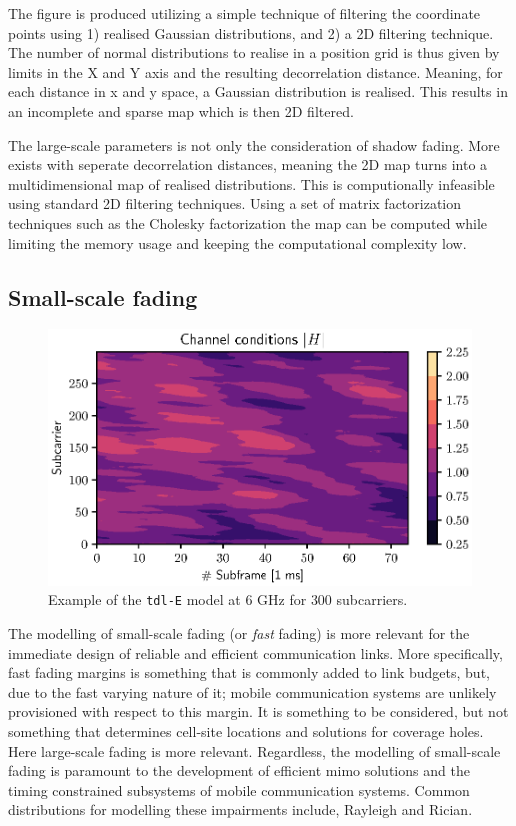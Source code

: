 The figure is produced utilizing a simple technique of filtering the coordinate points using 1) realised Gaussian distributions, and 2) a 2D filtering technique. The number of normal distributions to realise in a position grid is thus given by limits in the X and Y axis and the resulting decorrelation distance. Meaning, for each distance in x and y space, a Gaussian distribution is realised. This results in an incomplete and sparse map which is then 2D filtered.

The large-scale parameters is not only the consideration of shadow fading. More exists with seperate decorrelation distances, meaning the 2D map turns into a multidimensional map of realised distributions. This is computionally infeasible using standard 2D filtering techniques. Using a set of matrix factorization techniques such as the Cholesky factorization the map can be computed while limiting the memory usage and keeping the computational complexity low.


\subsection{Small-scale fading}
\begin{figure}
    \centering
    \includegraphics{chapters/part_pathloss/figures/fast_fading_example.eps}
    \caption{Example of the \texttt{\gls{tdl}-E} model at $6$ GHz for $300$ subcarriers.} 
    \label{fig:fast_fading_example}
\end{figure}


The modelling of small-scale fading (or \emph{fast} fading) is more relevant for the immediate design of reliable and efficient communication links. More specifically, fast fading margins is something that is commonly added to link budgets, but, due to the fast varying nature of it; mobile communication systems are unlikely provisioned with respect to this margin. It is something to be considered, but not something that determines cell-site locations and solutions for coverage holes. Here large-scale fading is more relevant. Regardless, the modelling of small-scale fading is paramount to the development of efficient \gls{mimo} solutions and the timing constrained subsystems of mobile communication systems. Common distributions for modelling these impairments include, Rayleigh and Rician.

